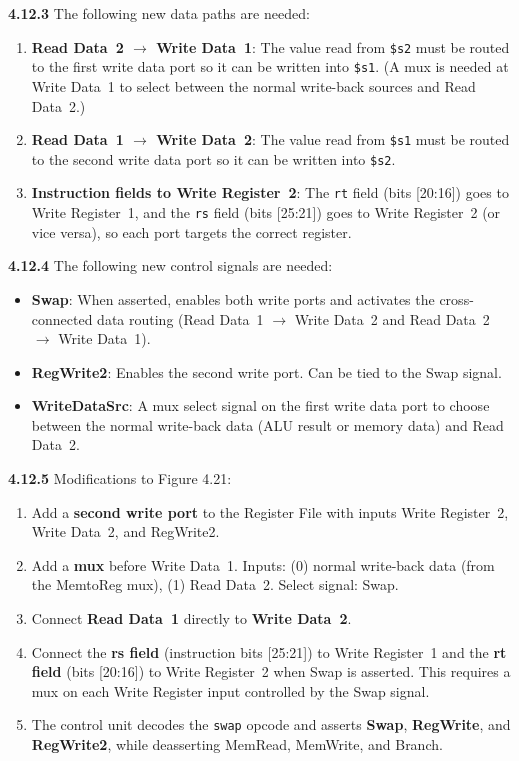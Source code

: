 \medskip\noindent\textbf{4.12.3}
The following new data paths are needed:
\begin{enumerate}
  \item \textbf{Read Data~2 $\to$ Write Data~1}: The value read from
        \texttt{\$s2} must be routed to the first write data port so it can
        be written into \texttt{\$s1}. (A mux is needed at Write Data~1 to
        select between the normal write-back sources and Read Data~2.)
  \item \textbf{Read Data~1 $\to$ Write Data~2}: The value read from
        \texttt{\$s1} must be routed to the second write data port so it can
        be written into \texttt{\$s2}.
  \item \textbf{Instruction fields to Write Register~2}: The \texttt{rt} field
        (bits [20:16]) goes to Write Register~1, and the \texttt{rs} field
        (bits [25:21]) goes to Write Register~2 (or vice versa), so each port
        targets the correct register.
\end{enumerate}

\medskip\noindent\textbf{4.12.4}
The following new control signals are needed:
\begin{itemize}
  \item \textbf{Swap}: When asserted, enables both write ports and activates
        the cross-connected data routing (Read Data~1 $\to$ Write Data~2 and
        Read Data~2 $\to$ Write Data~1).
  \item \textbf{RegWrite2}: Enables the second write port. Can be tied to the
        Swap signal.
  \item \textbf{WriteDataSrc}: A mux select signal on the first write data
        port to choose between the normal write-back data (ALU result or
        memory data) and Read Data~2.
\end{itemize}

\medskip\noindent\textbf{4.12.5}
Modifications to Figure 4.21:
\begin{enumerate}
  \item Add a \textbf{second write port} to the Register File with inputs
        Write Register~2, Write Data~2, and RegWrite2.
  \item Add a \textbf{mux} before Write Data~1. Inputs: (0) normal write-back
        data (from the MemtoReg mux), (1) Read Data~2. Select signal: Swap.
  \item Connect \textbf{Read Data~1} directly to \textbf{Write Data~2}.
  \item Connect the \textbf{rs field} (instruction bits [25:21]) to Write
        Register~1 and the \textbf{rt field} (bits [20:16]) to Write
        Register~2 when Swap is asserted. This requires a mux on each Write
        Register input controlled by the Swap signal.
  \item The control unit decodes the \texttt{swap} opcode and asserts
        \textbf{Swap}, \textbf{RegWrite}, and \textbf{RegWrite2}, while
        deasserting MemRead, MemWrite, and Branch.
\end{enumerate}

